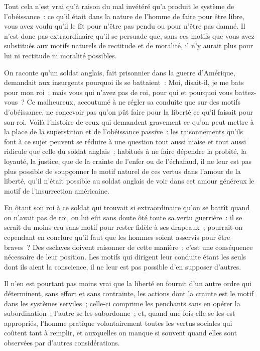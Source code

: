 \documentclass[french,twoside]{book} %
\begin{document}
Tout cela n’est vrai qu’à raison du mal invétéré qu’a produit le système de l’obéissance : ce qu’il était dans la nature de l’homme de faire pour être libre, vous avez voulu qu’il le fît pour n’être pas pendu ou pour n’être pas damné. Il n’est donc pas extraordinaire qu’il se persuade que, sans ces motifs que vous avez substitués aux motifs naturels de rectitude et de moralité, il n’y aurait plus pour lui ni rectitude ni moralité possibles.\par
On raconte qu’un soldat anglais, fait prisonnier dans la guerre d’Amérique, demandait aux insurgents pourquoi ils se battaient : Moi, disait-il, je me bats pour mon roi ; mais vous qui n’avez pas de roi, pour qui et pourquoi vous battez-vous ? Ce malheureux, accoutumé à ne régler sa conduite que sur des motifs d’obéissance, ne concevoir pas qu’on pût faire pour la liberté ce qu’il faisait pour son roi. Voilà l’histoire de ceux qui demandent gravement ce qu’on peut mettre à la place de la superstition et de l’obéissance passive : les raisonnements qu’ils font à ce sujet peuvent se réduire à une question tout aussi niaise et tout aussi ridicule que celle du soldat anglais : habitués à ne faire dépendre la probité, la loyauté, la justice, que de la crainte de l’enfer ou de l’échafaud, il ne leur est pas plus possible de soupçonner le motif naturel de ces vertus dans l’amour de la liberté, qu’il n’était possible au soldat anglais de voir dans cet amour généreux le motif de l’insurrection américaine.\par
En ôtant son roi à ce soldat qui trouvait si extraordinaire qu’on se battît quand on n’avait pas de roi, on lui eût sans doute ôté toute sa vertu guerrière : il se serait du moins cru sans motif pour rester fidèle à ses drapeaux ; pourrait-on cependant en conclure qu’il faut que les hommes soient asservis pour être braves ? Des esclaves doivent raisonner de cette manière ; c’est une conséquence nécessaire de leur position. Les motifs qui dirigent leur conduite étant les seuls dont ils aient la conscience, il ne leur est pas possible d’en supposer d’autres.\par
Il n’en est pourtant pas moins vrai que la liberté en fournit d’un autre ordre qui déterminent, sans effort et sans contrainte, les actions dont la crainte est le motif dans les systèmes serviles ; celle-ci comprime les penchants sans en opérer la subordination ; l’autre se les subordonne ; et, quand une fois elle se les est appropriés, l’homme pratique volontairement toutes les vertus sociales qui coûtent tant à remplir, et auxquelles on manque si souvent quand elles sont observées par d’autres considérations.\par
\end{document}
